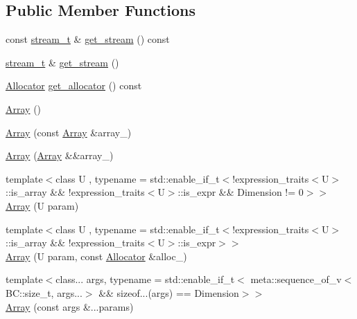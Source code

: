 \subsection*{Public Member Functions}
\begin{DoxyCompactItemize}
\item 
const \hyperlink{classBC_1_1tensors_1_1exprs_1_1Array_a1c41223fe60cc224c729fd9bed2a5714}{stream\+\_\+t} \& \hyperlink{classBC_1_1tensors_1_1exprs_1_1Array_abfbe916c27ded2ebce112ac0b3f954c9}{get\+\_\+stream} () const 
\item 
\hyperlink{classBC_1_1tensors_1_1exprs_1_1Array_a1c41223fe60cc224c729fd9bed2a5714}{stream\+\_\+t} \& \hyperlink{classBC_1_1tensors_1_1exprs_1_1Array_a936b6495997a465c005709f895471f1d}{get\+\_\+stream} ()
\item 
\hyperlink{namespaceBC_a934f94b17b06290e6b241e5f59930c5f}{Allocator} \hyperlink{classBC_1_1tensors_1_1exprs_1_1Array_a0b6398bf3e37a81b380e61c7055ee2f5}{get\+\_\+allocator} () const 
\item 
\hyperlink{classBC_1_1tensors_1_1exprs_1_1Array_a5346f4acaf8f8dcce5f0b09fbe430d0a}{Array} ()
\item 
\hyperlink{classBC_1_1tensors_1_1exprs_1_1Array_ae6457a76aeb8a63e5391688aa268a47b}{Array} (const \hyperlink{classBC_1_1tensors_1_1exprs_1_1Array}{Array} \&array\+\_\+)
\item 
\hyperlink{classBC_1_1tensors_1_1exprs_1_1Array_a18e700548bd564250c054de18a583002}{Array} (\hyperlink{classBC_1_1tensors_1_1exprs_1_1Array}{Array} \&\&array\+\_\+)
\item 
{\footnotesize template$<$class U , typename  = std\+::enable\+\_\+if\+\_\+t$<$!expression\+\_\+traits$<$\+U$>$\+::is\+\_\+array \&\&    												!expression\+\_\+traits$<$\+U$>$\+::is\+\_\+expr \&\&    													\+Dimension != 0$>$$>$ }\\\hyperlink{classBC_1_1tensors_1_1exprs_1_1Array_abfe88c02ec288455d1e5539a02a8293b}{Array} (U param)
\item 
{\footnotesize template$<$class U , typename  = std\+::enable\+\_\+if\+\_\+t$<$!expression\+\_\+traits$<$\+U$>$\+::is\+\_\+array \&\& !expression\+\_\+traits$<$\+U$>$\+::is\+\_\+expr$>$$>$ }\\\hyperlink{classBC_1_1tensors_1_1exprs_1_1Array_a5dc2bfdb8a9f7f734b2cefa5e3a5624d}{Array} (U param, const \hyperlink{namespaceBC_a934f94b17b06290e6b241e5f59930c5f}{Allocator} \&alloc\+\_\+)
\item 
{\footnotesize template$<$class... args, typename  = std\+::enable\+\_\+if\+\_\+t$<$		meta\+::sequence\+\_\+of\+\_\+v$<$\+B\+C\+::size\+\_\+t, args...$>$ \&\&		sizeof...(args) == Dimension$>$$>$ }\\\hyperlink{classBC_1_1tensors_1_1exprs_1_1Array_af527268f6313c845af47b176d78167b1}{Array} (const args \&...params)

\end{DoxyCompactItemize}
